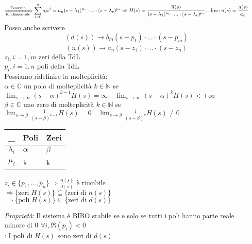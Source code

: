       \[
         \displaystyle\xRightarrow[\mathrm{fondamentale}]{\mathrm{Teorema}}\sum_{i = 0}^{n}a_is^i = a_n(s - \lambda_1)^{\mu_1}\cdot...\cdot(s - \lambda_r)^{\mu_r} \Rightarrow H(s) = \frac{\overline{n}(s)}{(s - \lambda_1)^{\mu_1}\cdot...\cdot(s - \lambda_r)^{\mu_r}}, \mathrm{\,\,dove\,\,}\overline{n}(s) = \frac{n(s)}{a_n}
      \]
      Posso anche scrivere
      \[
         \frac{(d(s)) \rightarrow b_m(s - p_1)\cdot...\cdot(s - p_m)}{(n(s)) \rightarrow a_n(s - z_1)\cdot...\cdot(s - z_n)}
      \]
      $z_i, i = \overline{1, m}$ zeri della TdL\\
      $p_i, i = \overline{1, n}$ poli della TdL\\
      Possiamo ridefinire la molteplicità:\\
      $\alpha\in\mathbb{C}$ un polo di molteplicità $k\in\mathbb{N}$ se $\displaystyle\lim_{s\to\infty}(s - \alpha)^{k - 1}H(s) = \infty\quad\lim_{s\to\infty}(s - \alpha)^kH(s) < +\infty$\\
      $\beta\in\mathbb{C}$ uno zero di molteplicità $k\in\mathbb{N}$ se $\displaystyle\lim_{s\to\beta}\frac{1}{(s - \beta)^{k - 1}}H(s) = 0\quad\lim_{s\to\beta}\frac{1}{(s - \beta)^k}H(s) \neq 0$
      \begin{center}
         \begin{tabular}{lll}
            \toprule
            \_ & Poli & Zeri \\
            \midrule
            $\lambda_i$ & $\alpha$ & $\beta$ \\
            $\mu_i$ & k & k \\
            \bottomrule
         \end{tabular}
      \end{center}
      \begin{osservazione}
         $z_i\in\{p_1,\dots,p_n\} \Rightarrow \frac{n(s)}{d(s)}$ è riucibile\\
         $\Rightarrow \{\mathrm{zeri\,\,}H(s)\} \subseteq \{\mathrm{zeri\,\,di\,\,}n(s)\}$\\
         $\Rightarrow \{\mathrm{poli\,\,}H(s)\} \subseteq \{\mathrm{zeri\,\,di\,\,}d(s)\}$
      \end{osservazione}
      \emph{Proprietà}: Il sistema è BIBO stabile se e solo se tutti i poli hanno parte reale minore di 0 $\forall i, \Re(p_i) < 0$\\
      \NB: I poli di $H(s)$ sono zeri di $d(s)$
%

